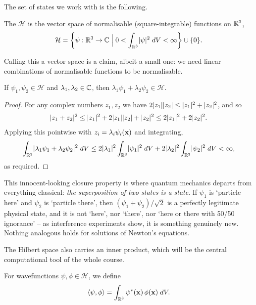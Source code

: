 \documentclass[a4paper]{scrartcl}
\newcommand{\inp}[2]{\langle #1, #2 \rangle}
\begin{document}
The set of states we work with is the following.

\begin{definition}
    The  $\mathcal{H}$ is the vector space of normalisable (square-integrable) functions on $\mathbb{R}^3$,
    $$
    \mathcal{H} = \left\{ \psi : \mathbb{R}^3 \rightarrow \mathbb{C} \;\Big|\; 0 < \int_{\mathbb{R}^3} \lvert\psi\rvert^2 \; d V < \infty \right\} \cup \{0\}.
    $$
\end{definition}

Calling this a vector space is a claim, albeit a small one: we need linear combinations of normalisable functions to be normalisable.

\begin{proposition}
    If $\psi_1, \psi_2 \in \mathcal{H}$ and $\lambda_1, \lambda_2 \in \mathbb{C}$, then $\lambda_1 \psi_1 + \lambda_2 \psi_2 \in \mathcal{H}$.
\end{proposition}
\begin{proof}
    For any complex numbers $z_1, z_2$ we have $2\lvert z_1\rvert\lvert z_2\rvert \leq \lvert z_1\rvert^2 + \lvert z_2\rvert^2$, and so
    $$
    \lvert z_1 + z_2\rvert^2 \leq \lvert z_1\rvert^2 + 2 \lvert z_1\rvert \lvert z_2\rvert + \lvert z_2\rvert^2 \leq 2\lvert z_1\rvert^2 + 2\lvert z_2\rvert^2.
    $$
    Applying this pointwise with $z_i = \lambda_i \psi_i(\mathbf{x})$ and integrating,
    $$
    \int_{\mathbb{R}^3} \lvert\lambda_1 \psi_1 + \lambda_2 \psi_2\rvert^2 \; d V \leq 2 \lvert\lambda_1\rvert^2 \int_{\mathbb{R}^3} \lvert\psi_1\rvert^2 \; d V + 2 \lvert\lambda_2\rvert^2 \int_{\mathbb{R}^3} \lvert\psi_2\rvert^2 \; d V < \infty,
    $$
    as required.
\end{proof}

This innocent-looking closure property is where quantum mechanics departs from everything classical: \emph{the superposition of two states is a state}. If $\psi_1$ is `particle here' and $\psi_2$ is `particle there', then $(\psi_1 + \psi_2)/\sqrt{2}$ is a perfectly legitimate physical state, and it is not `here', nor `there', nor `here or there with 50/50 ignorance' -- as interference experiments show, it is something genuinely new. Nothing analogous holds for solutions of Newton's equations.

The Hilbert space also carries an inner product, which will be the central computational tool of the whole course.

\begin{definition}
    For wavefunctions $\psi, \phi \in \mathcal{H}$, we define
    $$
    \inp{\psi}{\phi} = \int_{\R^3} \psi^* (\vv{x}) \, \phi(\vv{x}) \dd V.
    $$
\end{definition}
\end{document}
